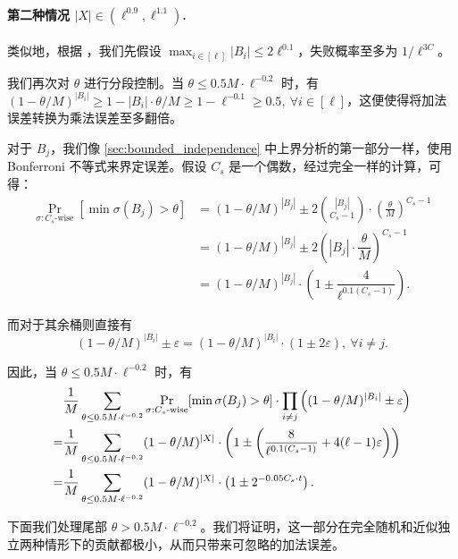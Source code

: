 \paragraph{第二种情况 $|X| \in (\ell^{0.9}, \ell^{1.1})$.}

类似地，根据 ，我们先假设 $\max_{i \in [\ell]} |B_i| \le 2 \ell^{0.1}$，失败概率至多为 $1 / \ell^{3 C}$。

我们再次对 $\theta$ 进行分段控制。当 $\theta \le 0.5 M \cdot \ell^{-0.2}$ 时，有 $(1 - \theta / M)^{|B_i|} \ge 1 - |B_i| \cdot \theta / M \ge 1 - \ell^{-0.1} \ge 0.5,\ \forall i \in [\ell]$，这便使得将加法误差转换为乘法误差至多翻倍。

对于 $B_j$，我们像 \ref{sec:bounded_independence} 中上界分析的第一部分一样，使用 Bonferroni 不等式来界定误差。假设 $C_s$ 是一个偶数，经过完全一样的计算，可得：
\begin{align*}
    \Pr_{\sigma : C_s\text{-wise}}[\min \sigma(B_j) > \theta] & = (1 - \theta / M)^{|B_j|} \pm 2 \binom{|B_j|}{C_s - 1} \cdot \left( \frac{\theta}{M} \right)^{C_s - 1} \\
      & = (1 - \theta / M)^{|B_j|} \pm 2 \left( |B_j| \cdot \dfrac{\theta}{M} \right)^{C_s - 1} \\
      & = (1 - \theta / M)^{|B_j|} \cdot \left( 1 \pm \dfrac{4}{\ell^{0.1 (C_s - 1)}} \right).
\end{align*}

而对于其余桶则直接有
$$
(1 - \theta / M)^{|B_i|} \pm \varepsilon = (1 - \theta / M)^{|B_i|} \cdot \left( 1 \pm 2 \varepsilon \right),\ \forall i \ne j.
$$

因此，当 $\theta \le 0.5 M \cdot \ell^{-0.2}$ 时，有
\begin{align}
      & \dfrac{1}{M} \sum_{\theta \le 0.5 M \cdot \ell^{-0.2}} \Pr_{\sigma : C_s\text{-wise}}[\min \sigma(B_j) > \theta] \cdot \prod_{i \ne j} \left( (1 - \theta / M)^{|B_i|} \pm \varepsilon \right) \notag \\
    = & \dfrac{1}{M} \sum_{\theta \le 0.5 M \cdot \ell^{-0.2}} (1 - \theta / M)^{|X|} \cdot \left( 1 \pm \left( \dfrac{8}{\ell^{0.1 (C_s - 1)}} + 4 (\ell - 1) \varepsilon \right) \right) \notag \\
    = & \dfrac{1}{M} \sum_{\theta \le 0.5 M \cdot \ell^{-0.2}} (1 - \theta / M)^{|X|} \cdot \left( 1 \pm 2^{-0.05 C_s \cdot t} \right). \label{eq:X2_theta_small}
\end{align}

下面我们处理尾部 $\theta > 0.5 M \cdot \ell^{-0.2}$。我们将证明，这一部分在完全随机和近似独立两种情形下的贡献都极小，从而只带来可忽略的加法误差。

